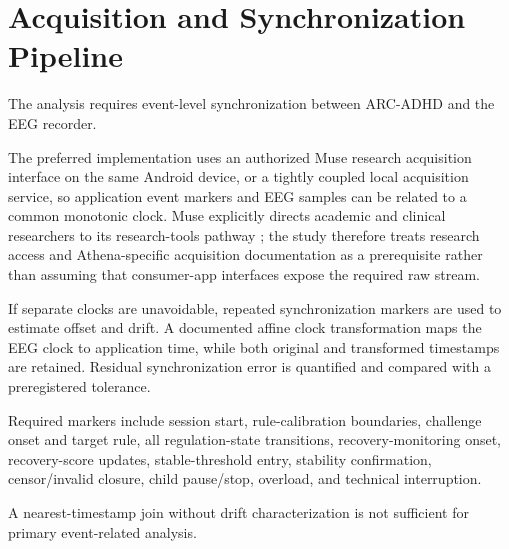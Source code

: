 \section{Acquisition and Synchronization Pipeline}

The analysis requires event-level synchronization between ARC-ADHD and the EEG recorder.

The preferred implementation uses an authorized Muse research acquisition interface on the same Android device, or a tightly coupled local acquisition service, so application event markers and EEG samples can be related to a common monotonic clock. Muse explicitly directs academic and clinical researchers to its research-tools pathway \parencite{interaxonDevelopers2026}; the study therefore treats research access and Athena-specific acquisition documentation as a prerequisite rather than assuming that consumer-app interfaces expose the required raw stream.

If separate clocks are unavoidable, repeated synchronization markers are used to estimate offset and drift. A documented affine clock transformation maps the EEG clock to application time, while both original and transformed timestamps are retained. Residual synchronization error is quantified and compared with a preregistered tolerance.

Required markers include session start, rule-calibration boundaries, challenge onset and target rule, all regulation-state transitions, recovery-monitoring onset, recovery-score updates, stable-threshold entry, stability confirmation, censor/invalid closure, child pause/stop, overload, and technical interruption.

A nearest-timestamp join without drift characterization is not sufficient for primary event-related analysis.
